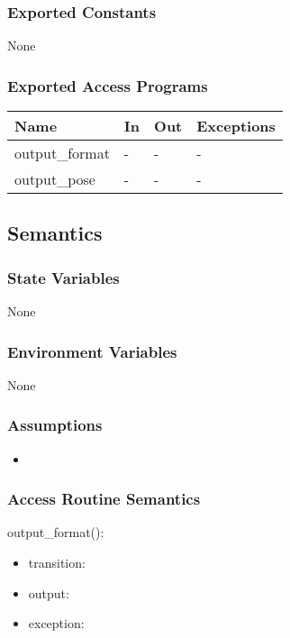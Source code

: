 \documentclass[12pt, titlepage]{article}
\begin{document}
\subsubsection{Exported Constants}
None

\subsubsection{Exported Access Programs}

\begin{center}
\begin{tabular}{p{4cm} p{4cm} p{4cm} p{2cm}}
\hline
\textbf{Name} & \textbf{In} & \textbf{Out} & \textbf{Exceptions} \\
\hline
output\_format & - & - & - \\
output\_pose & - & - & - \\
\hline
\end{tabular}
\end{center}

\subsection{Semantics}

\subsubsection{State Variables}
None
\subsubsection{Environment Variables}
None

\subsubsection{Assumptions}
\begin{itemize}
  \item 
\end{itemize}
\subsubsection{Access Routine Semantics}

\noindent output\_format():
\begin{itemize}
\item transition:  
\item output:  
\item exception:  
\end{itemize}
\end{document}
